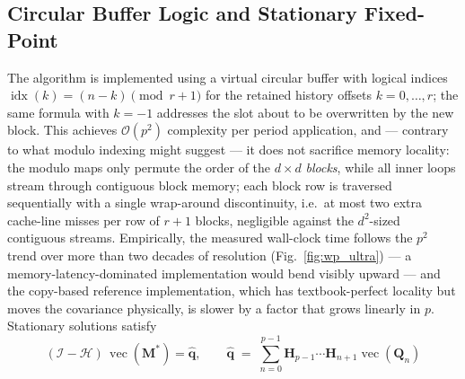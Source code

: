 \documentclass[preprint,12pt]{elsarticle}
\begin{document}
\subsection{Circular Buffer Logic and Stationary Fixed-Point}
The algorithm is implemented using a virtual circular buffer with logical indices $\operatorname{idx}(k) = (n-k) \pmod{r+1}$ for the retained history offsets $k = 0,\dots,r$; the same formula with $k = -1$ addresses the slot about to be overwritten by the new block. This achieves $\mathcal{O}(p^2)$ complexity per period application, and --- contrary to what modulo indexing might suggest --- it does not sacrifice memory locality: the modulo maps only permute the order of the $d\times d$ \emph{blocks}, while all inner loops stream through contiguous block memory; each block row is traversed sequentially with a single wrap-around discontinuity, i.e.\ at most two extra cache-line misses per row of $r{+}1$ blocks, negligible against the $d^2$-sized contiguous streams. Empirically, the measured wall-clock time follows the $p^2$ trend over more than two decades of resolution (Fig.~\ref{fig:wp_ultra}) --- a memory-latency-dominated implementation would bend visibly upward --- and the copy-based reference implementation, which has textbook-perfect locality but moves the covariance physically, is slower by a factor that grows linearly in $p$. Stationary solutions satisfy
\begin{equation}
(\mathcal{I} - \mathcal{H})\, \operatorname{vec}(\mathbf{M}^*) = \hat{\mathbf{q}},
\qquad
\hat{\mathbf{q}} \;=\; \sum_{n=0}^{p-1} \mathbf{H}_{p-1}\cdots\mathbf{H}_{n+1} \operatorname{vec}(\mathbf{Q}_n)
\end{equation}
\end{document}
